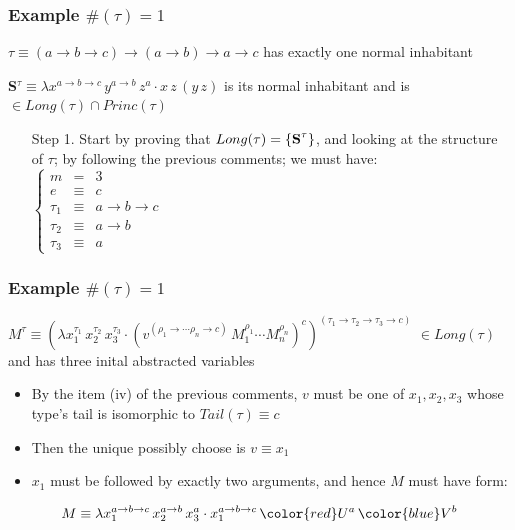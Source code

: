 \begin{frame}
\frametitle{Example $\#(\tau) = 1$}
\begin{block}{ $\tau \equiv (a \to b \to c) \to (a \to b) \to a \to c$}
has exactly one normal inhabitant
\end{block}
\begin{block}{\textbf{S}$^{\tau} \equiv \lambda x^{a \to b \to c}\,y^{a \to b}\,z^a\cdot x\,z\,(y\,z)$}
is its normal inhabitant and is $\in Long(\tau) \cap Princ(\tau)$
\end{block}

\vspace*{0.3 cm}

 \begin{itemize}
  \item[Step 1.] Start by proving that $Long(\tau) = \{\mbox{\textbf{S}}^{\tau}\}$, and looking at the structure of $\tau$; 
  by following the previous comments; we must have:\\[0.2 cm] 
  
			      $\left\{\begin{array}{lcl}
                               m & = & 3 \\
                               e & \equiv & c \\
                               \tau_1 & \equiv & a \to b \to c \\
                               \tau_2 & \equiv & a \to b \\
                               \tau_3 & \equiv & a
                              \end{array}\right.$

 \end{itemize}

 \end{frame}
 
\begin{frame}
\frametitle{Example $\#(\tau) = 1$}
\begin{block}{$M^{\tau} \equiv (\lambda x_1^{\tau_1}\,x_2^{\tau_2}\,x_3^{\tau_3}\cdot(v^{(\rho_1 \to \cdots \rho_n \to c)}\,M_1^{\rho_1}\cdots M_n^{\rho_n})^c)^{(\tau_1 \to \tau_2 \to \tau_3 \to c)} $} 
$\in Long(\tau)$ and has three inital abstracted variables 
\end{block}
\begin{itemize}
 \item By the item (iv) of the previous comments, $v$ must be one of $x_1, x_2, x_3$ whose type's tail is isomorphic to $Tail(\tau) \equiv c$
 \item Then the unique possibly choose is $v \equiv x_1$
 \item $x_1$ must be followed by exactly two arguments, and hence $M$ must have form:
\end{itemize}

\begin{equation}
M \equiv \lambda x_1^{a\to b\to c}\,x_2^{a\to b}\,x_3^a \cdot x_1^{a \to b \to c}\,{\color{red}U^a}\,{\color{blue}V^b}
\end{equation}
\end{frame}

